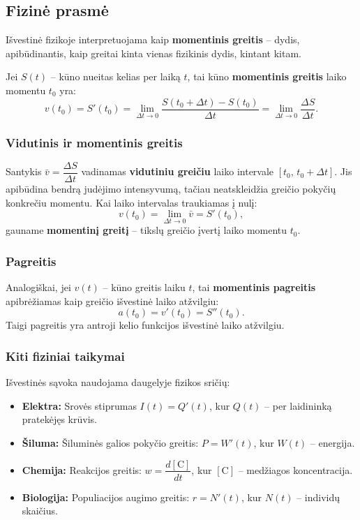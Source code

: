 \subsection{Fizinė prasmė}

Išvestinė fizikoje interpretuojama kaip \textbf{momentinis greitis} – dydis, apibūdinantis, kaip greitai kinta vienas fizikinis dydis, kintant kitam.

\begin{tcolorbox}[colback=green!5!white, colframe=green!60!black, title=Fizinė išvestinės prasmė]
Jei $S(t)$ – kūno nueitas kelias per laiką $t$, tai kūno \textbf{momentinis greitis} laiko momentu $t_0$ yra:
\[
v(t_0) = S'(t_0) = \lim_{\Delta t \to 0} \frac{S(t_0 + \Delta t) - S(t_0)}{\Delta t} = \lim_{\Delta t \to 0}\frac{\Delta S}{\Delta t}.
\]
\end{tcolorbox}

\subsubsection*{Vidutinis ir momentinis greitis}

Santykis $\bar{v} = \dfrac{\Delta S}{\Delta t}$ vadinamas \textbf{vidutiniu greičiu} laiko intervale $[t_0,\, t_0 + \Delta t]$. Jis apibūdina bendrą judėjimo intensyvumą, tačiau neatskleidžia greičio pokyčių konkrečiu momentu. Kai laiko intervalas traukiamas į nulį:
\[
v(t_0) = \lim_{\Delta t \to 0} \bar{v} = S'(t_0),
\]
gauname \textbf{momentinį greitį} – tikslų greičio įvertį laiko momentu $t_0$.

\subsubsection*{Pagreitis}

Analogiškai, jei $v(t)$ – kūno greitis laiku $t$, tai \textbf{momentinis pagreitis} apibrėžiamas kaip greičio išvestinė laiko atžvilgiu:
\[
a(t_0) = v'(t_0) = S''(t_0).
\]
Taigi pagreitis yra antroji kelio funkcijos išvestinė laiko atžvilgiu.

\subsubsection*{Kiti fiziniai taikymai}

Išvestinės sąvoka naudojama daugelyje fizikos sričių:

\begin{itemize}
    \item \textbf{Elektra:} Srovės stiprumas $I(t) = Q'(t)$, kur $Q(t)$ – per laidininką pratekėjęs krūvis.
    \item \textbf{Šiluma:} Šiluminės galios pokyčio greitis: $P = W'(t)$, kur $W(t)$ – energija.
    \item \textbf{Chemija:} Reakcijos greitis: $w = \dfrac{d[\text{C}]}{dt}$, kur $[\text{C}]$ – medžiagos koncentracija.
    \item \textbf{Biologija:} Populiacijos augimo greitis: $r = N'(t)$, kur $N(t)$ – individų skaičius.
\end{itemize}

